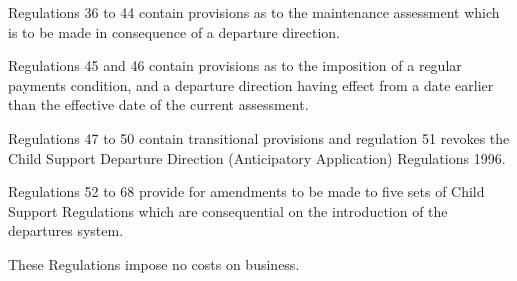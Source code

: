\documentclass[a4paper]{article}
\begin{document}
Regulations 36 to 44 contain provisions as to the maintenance assessment which
is to be made in consequence of a departure direction.

Regulations 45 and 46 contain provisions as to the imposition of a regular
payments condition, and a departure direction having effect from a date earlier
than the effective date of the current assessment.

Regulations 47 to 50 contain transitional provisions and regulation 51 revokes
the Child Support Departure Direction (Anticipatory Application) Regulations
1996.

Regulations 52 to 68 provide for amendments to be made to five sets of Child
Support Regulations which are consequential on the introduction of the
departures system.

  These Regulations impose no costs on business.
\end{document}
